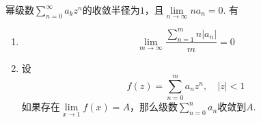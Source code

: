 \begin{theorem}[Tauber定理]

    幂级数$\sum\limits_{n = 0}^{\infty}{a_k z^n}$的收敛半径为$1$，且$\lim\limits_{n \to \infty}{na_n} = 0$. 有

    \begin{enumerate}
        
        \item \[\lim\limits_{m \to \infty}{\dfrac{\sum\limits_{n = 1}^{m}{n|a_n|}}{m}} = 0\]
        
        \item 
            设
            \[f(z) = \sum\limits_{n = 0}^{m}{a_n z^n}, \quad |z| < 1\]
            如果存在$\lim\limits_{x \to 1}{f(x)} = A$，那么级数$\sum\limits_{n = 0}^{n}{a_n}$收敛到$A$.
        
    \end{enumerate}

\end{theorem}


